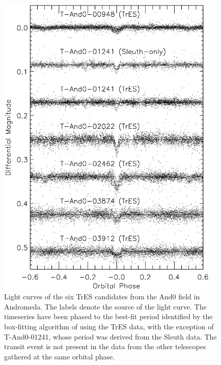 \begin{figure}
\begin{center}
\includegraphics[width=0.95\textwidth]{2_f3}
\caption[TrES light curves of the six candidates from the And0 field]{Light curves of the six TrES candidates from the And0 field in Andromeda. The labels denote the source of the light curve. The timeseries have been phased to the best-fit period identified by the box-fitting algorithm of \citet{Kovacs_Zucker_Mazeh:aa:2002a} using the TrES data, with the exception of \mbox{T-And0-01241}, whose period was derived from the Sleuth data. The transit event is not present in the data from the other telescopes gathered at the same orbital phase.}
\label{cha:and0:fig:tresCand}
\end{center}
\end{figure}

